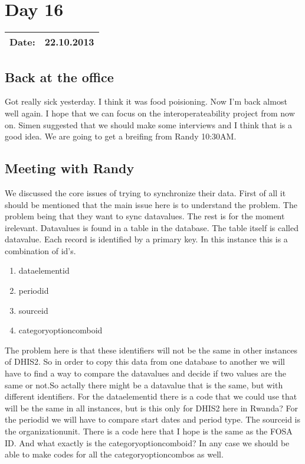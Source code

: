 \section{Day 16}
\begin{tabular}{|c|c|}
\hline
Date: & 22.10.2013 \\
\hline
\end{tabular}
\subsection{Back at the office}
Got really sick yesterday. I think it was food poisioning. Now I'm back almost well again.
I hope that we can focus on the interoperateability project from now on. 
Simen suggested that we should make some interviews and I think that is a good idea.
We are going to get a breifing from Randy 10:30AM.
\subsection{Meeting with Randy}
We discussed the core issues of trying to synchronize their data. First of all it should be mentioned that the main issue here is to understand the problem. The problem being that they want to sync datavalues. The rest is for the moment irelevant. Datavalues is found in a table in the database. The table itself is called datavalue. Each record is identified by a primary key. In this instance this is a combination of id's. 
\begin{enumerate}
	\item dataelementid
	\item periodid
	\item sourceid
	\item categoryoptioncomboid
\end{enumerate}
The problem here is that these identifiers will not be the same in other instances of DHIS2. So in order to copy this data from one database to another we will have to find a way to compare the datavalues and decide if two values are the same or not.So actally there might be a datavalue that is the same, but with different identifiers. For the dataelementid there is a code that we could use that will be the same in all instances, but is this only for DHIS2 here in Rwanda? For the periodid we will have to compare start dates and period type.
The sourceid is the organizationunit. There is a code here that I hope is the same as the FOSA ID. 
And what exactly is the categoryoptioncomboid? In any case we should be able to make codes for all the categoryoptioncombos as well.  
